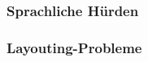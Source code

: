\subsubsection{Sprachliche Hürden}
\subsubsection{Layouting-Probleme}




\begin{comment}
Das einleitende Beispiel (~\ref{tab:problems:example}) zeigt allerdings auf, welche Fehler sich bei einem imaginären Befehl \texttt{ink} zeigen könnten und inwiefern einige es erlauben \textit{würden}\pdfcomment{evtl. gebraucht, falls solche Unterscheidung später benötigt}, dass kleinere Fehler missachtet werden können. Der Befehl selbst soll einen String mit einer bestimmten Farbe hinterlegen und besitzt einen zusätzlichen optionalen Farbparameter. 
\enquote{Richtig} wäre es im originalen String nur das Wort in den geschwungenen Klammern zu übersetzen, da hierbei an keiner Stelle Information verloren geht und das Wort, nachdem es vom Deutschen ins Englische übersetzt wurde, weiterhin so wie vorgesehen hervorgehoben wird.
\enquote{Zulässige} Übersetzungen treten dann auf, wenn nur für die Formatierung (insofern hieraus keine weiteren Probleme entstehen) verloren geht. Im gegebenen Beispiel würde dann zwar die farbige Hinterlegung verloren gehen, das Wort allerdings trotzdem übersetzt werden und würde den Weg in ein Dokument finden, ohne einen sprachlichen Informationsverlust zu riskieren (für den Endnutzer/Leser).\footnote{Selbst bei weißer Schriftfarbe kann das Wort in einem PDF-Reader markiert und kopiert werden.}
\enquote{Unerwünscht} sind Fälle, in denen ein Übersetzen Fehler für die \TeX{}-Engine produziert. Übersetzt man hier z.B.\ \texttt{ink} nach \texttt{Tinte} könnte es sich bei Zweiterem wiederum um einen anderen Befehl handeln, das Wort \textit{Wort} einliest, aber eigentlich den alphanumerischen Wert von \textit{word} erwartet hätte.\footnote{$57_{16}+6f_{16} + 72_{16} + 74_{16} = 25\times 16^1 + 28 = 400$ statt:\ $77_{16}+6f_{16} + 72_{16} + 64_{16} = 26\times 16^1 + 28 = 416$. Wofür der Befehl \texttt{Tinte} einen/den Integer 416 benötigt, kann ich Ihnen allerdings nicht erläutern.} Ein Fehlschlagen des Befehls \texttt{Tinte} würde zwar einen Fehler für den \TeX{}-Parser produzieren, dieser wüsste dann aber, dass dieser Befehl bereits einmal fehlgeschlagen ist und eine neues Kompilieren verlangen, in welchem dieser Befehl und seine Optionen ignoriert werden, wodurch das Wort auch hier im Dokument landen würde. Man kann allerdings nicht bei jedem beliebigen \TeX{}-Befehl davon ausgehen, dass dieses Verhalten einheitlich auftreten wird. Hierbei existieren Fälle, welche dafür sorgen könnten, dass andere Wörter nun nicht mehr Teil eines Dokumentes werden könnten~\ref{}.%

\end{comment}
